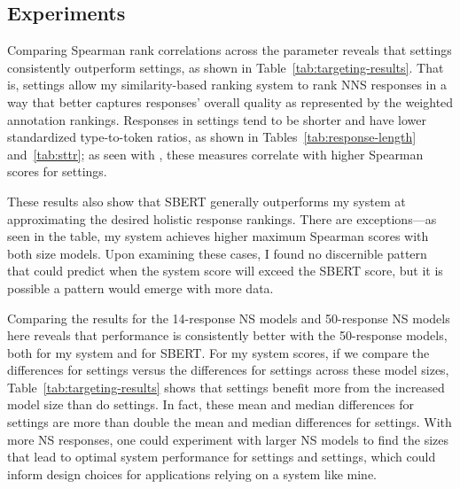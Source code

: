 \subsection{ Experiments}
\label{sec:exp-targeting}

Comparing Spearman rank correlations across the  parameter reveals that  settings consistently outperform  settings, as shown in Table~\ref{tab:targeting-results}. That is,  settings allow my similarity-based ranking system to rank NNS responses in a way that better captures responses' overall quality as represented by the weighted annotation rankings. Responses in  settings tend to be shorter and have lower standardized type-to-token ratios, as shown in Tables~\ref{tab:response-length} and~\ref{tab:sttr}; as seen with , these measures correlate with higher Spearman scores for  settings.

These results also show that SBERT generally outperforms my system at approximating the desired holistic response rankings. There are exceptions---as seen in the table, my system achieves higher maximum Spearman scores with both size models. Upon examining these cases, I found no discernible pattern that could predict when the system score will exceed the SBERT score, but it is possible a pattern would emerge with more data.

Comparing the results for the 14-response NS models and 50-response NS models here reveals that performance is consistently better with the 50-response models, both for my system and for SBERT. For my system scores, if we compare the differences for  settings versus the differences for  settings across these model sizes, Table~\ref{tab:targeting-results} shows that  settings benefit more from the increased model size than do  settings. In fact, these mean and median differences for  settings are more than double the mean and median differences for  settings.
With more NS responses, one could experiment with larger NS models to find the sizes that lead to optimal system performance for  settings and  settings, which could inform design choices for applications relying on a system like mine.

